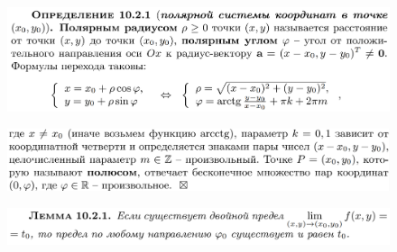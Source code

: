 \documentclass{article}
\begin{document}
\begin{figure}[h!]
    \centering
    \vspace{-1cm}
\end{figure}
\newpage
\begin{figure}[h!]
    \centering
    \includegraphics[width=\textwidth]{17.png}
    \vspace{-1cm}
\end{figure}
\begin{figure}[h!]
    \centering
    \includegraphics[width=\textwidth]{18.png}
    \vspace{-1cm}
\end{figure}
\begin{figure}[h!]
    \centering
    \vspace{-1cm}
\end{figure}
\begin{figure}[h!]
    \centering
    \includegraphics[width=\textwidth]{20.png}
    \vspace{-1cm}
\end{figure}
\end{document}
